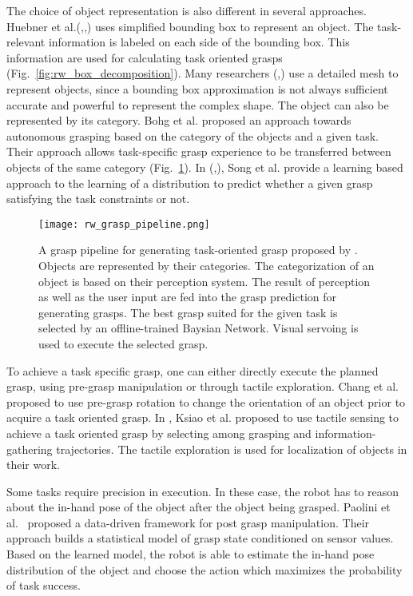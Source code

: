 The choice of object representation is also different in several approaches. Huebner et al.(\cite{Huebner2009},\cite{Huebner2008_2},\cite{Geidenstam2009}) uses simplified bounding box to represent an object. The task-relevant information is labeled on each side of the bounding box. This information are used for calculating task oriented grasps (Fig.~\ref{fig:rw_box_decomposition}). Many researchers (\cite{Dang2012},\cite{Borst2004}) use a detailed mesh to represent objects, since a bounding box approximation is not always sufficient accurate and powerful to represent the complex shape. The object can also be represented by its category. Bohg et al.\cite{bohg2012task} proposed an approach towards autonomous grasping based on the category of the objects and a given task. Their approach allows task-specific grasp experience to be transferred between objects of the same category (Fig.~\ref{fig:rw_grasp_pipeline}). In (\cite{Song2011},\cite{song2010learning}), Song et al. provide a learning based approach to the learning of a distribution to predict whether a given grasp satisfying the task constraints or not. 
\begin{figure}[!htbp]
\centering
\texttt{[image: rw\_grasp\_pipeline.png]}
\captionsetup{justification=raggedright}
\caption{A grasp pipeline for generating task-oriented grasp proposed by \cite{bohg2012task}. Objects are represented by their categories. The categorization of an object is based on their perception system. The result of perception as well as the user input are fed into the grasp prediction for generating grasps. The best grasp suited for the given task is selected by an offline-trained Baysian Network. Visual servoing is used to execute the selected grasp.}
\label{fig:rw_grasp_pipeline}       %
\end{figure} 
To achieve a task specific grasp, one can either directly execute the planned grasp, using pre-grasp manipulation or through tactile exploration. Chang et al.~\cite{Chang2010} proposed to use pre-grasp rotation to change the orientation of an object prior to acquire a task oriented grasp. In \cite{Hsiao2010RSS}, Ksiao et al. proposed to use tactile sensing to achieve a task oriented grasp by selecting among grasping and information-gathering trajectories. The tactile exploration is used for localization of objects in their work. 

Some tasks require precision in execution. In these case, the robot has to reason about the in-hand pose of the object after the object being grasped. Paolini et al.~\cite{Paolini2014} proposed a data-driven framework for post grasp manipulation. Their approach builds a   statistical model of grasp state conditioned on sensor values. Based on the learned model, the robot is able to estimate the in-hand pose distribution of the object and choose the action which maximizes the probability of task success. 


